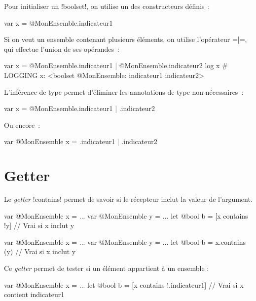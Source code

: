 Pour initialiser un \ggsq!boolset!, on utilise un des constructeurs définis~:
\begin{galgas34}
var x = @MonEnsemble.indicateur1
\end{galgas34}

Si on veut un ensemble contenant plusieurs éléments, on utilise l'opérateur \ggsq=|=, qui effectue l'union de ses opérandes~:
\begin{galgas34}
var x = @MonEnsemble.indicateur1 | @MonEnsemble.indicateur2
log x # LOGGING x: <boolset @MonEnsemble: indicateur1 indicateur2>
\end{galgas34}

L'inférence de type permet d'éliminer les annotations de type non nécessaires~:
\begin{galgas34}
var x = @MonEnsemble.indicateur1 | .indicateur2
\end{galgas34}

Ou encore~:
\begin{galgas34}
var @MonEnsemble x = .indicateur1 | .indicateur2
\end{galgas34}





















\section{Getter}


Le \emph{getter} \ggsq!contains! permet de savoir si le récepteur inclut la valeur de l'argument.


\begin{galgas3}
var @MonEnsemble x = ...
var @MonEnsemble y = ...
let @bool b = [x contains !y] // Vrai si x inclut y
\end{galgas3}

\begin{galgas4}
var @MonEnsemble x = ...
var @MonEnsemble y = ...
let @bool b = x.contains (y) // Vrai si x inclut y
\end{galgas4}

Ce \emph{getter} permet de tester si un élément appartient à un ensemble :
\begin{galgas3}
var @MonEnsemble x = ...
let @bool b = [x contains !.indicateur1] // Vrai si x contient indicateur1
\end{galgas3}

